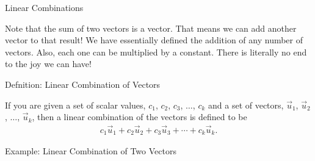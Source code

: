 \documentclass[svgnames,table,,aspectratio=169]{beamer}
\newcommand{\columnVector}[1]{%
  \left[
    \begin{array}{r}
    #1                           
    \end{array}
  \right]
}
\begin{document}
\begin{frame}{Linear Combinations}

  Note that the sum of two vectors is a vector. That means we can add
  another vector to that result! We have essentially defined the
  addition of any number of vectors. Also, each one can be multiplied
  by a constant. There is literally no end to the joy we can have!

  \begin{block}{Defnition: Linear Combination of Vectors}

    If you are given a set of scalar values, $c_1$, $c_2$, $c_3$,
    $\ldots$, $c_k$ and a set of vectors, $\vec{u}_1$, $\vec{u}_2$,
    $\ldots$, $\vec{u}_k$, then a linear combination of the vectors is
    defined to be
    \begin{eqnarray*}
      c_1 \vec{u}_1 + c_2 \vec{u}_2 + c_3 \vec{u}_3 + \cdots + c_k \vec{u}_k.
    \end{eqnarray*}
    
  \end{block}
  
\end{frame}


\begin{frame}{Example: Linear Combination of Two Vectors}

  \begin{columns}

    \only<1>{
      \begin{eqnarray*}
        2\columnVector{1 \\ -2} + 3\columnVector{-2 \\ 1}
      \end{eqnarray*}
    }

    \only<2>{
      \begin{eqnarray*}
        c_1 \columnVector{1 \\ -2} + c_2 \columnVector{-2 \\ 1}
      \end{eqnarray*}
    }

  
\end{columns}
  
\end{frame}
\end{document}
